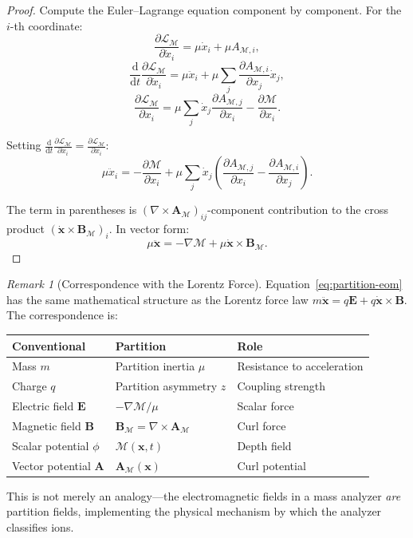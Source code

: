 \documentclass[11pt,twocolumn,a4paper]{article}
\theoremstyle{definition}
\theoremstyle{remark}
\newtheorem{remark}[theorem]{Remark}
\newcommand{\Depth}{\mathcal{M}}
\newcommand{\partinert}{\mu}
\newcommand{\Apartition}{\mathbf{A}_{\mathcal{M}}}
\newcommand{\Lagr}{\mathcal{L}}
\begin{document}
\begin{proof}
Compute the Euler--Lagrange equation component by component. For the $i$-th coordinate:
\[
  \frac{\partial \Lagr_\Depth}{\partial \dot{x}_i} = \partinert \dot{x}_i + \partinert A_{\Depth,i},
\]
\[
  \frac{\mathrm{d}}{\mathrm{d}t}\frac{\partial \Lagr_\Depth}{\partial \dot{x}_i} = \partinert \ddot{x}_i + \partinert \sum_j \frac{\partial A_{\Depth,i}}{\partial x_j} \dot{x}_j,
\]
\[
  \frac{\partial \Lagr_\Depth}{\partial x_i} = \partinert \sum_j \dot{x}_j \frac{\partial A_{\Depth,j}}{\partial x_i} - \frac{\partial \Depth}{\partial x_i}.
\]

Setting $\frac{\mathrm{d}}{\mathrm{d}t}\frac{\partial \Lagr_\Depth}{\partial \dot{x}_i} = \frac{\partial \Lagr_\Depth}{\partial x_i}$:
\[
  \partinert \ddot{x}_i = -\frac{\partial \Depth}{\partial x_i} + \partinert \sum_j \dot{x}_j \left(\frac{\partial A_{\Depth,j}}{\partial x_i} - \frac{\partial A_{\Depth,i}}{\partial x_j}\right).
\]

The term in parentheses is $(\nabla \times \Apartition)_{ij}$-component contribution to the cross product $(\dot{\mathbf{x}} \times \mathbf{B}_\Depth)_i$. In vector form:
\[
  \partinert \ddot{\mathbf{x}} = -\nabla\Depth + \partinert \dot{\mathbf{x}} \times \mathbf{B}_\Depth.
\]
\end{proof}

\begin{remark}[Correspondence with the Lorentz Force]
\label{rem:lorentz}
Equation~\eqref{eq:partition-eom} has the same mathematical structure as the Lorentz force law $m\ddot{\mathbf{x}} = q\mathbf{E} + q\dot{\mathbf{x}} \times \mathbf{B}$. The correspondence is:
\begin{center}
\begin{tabular}{lll}
\toprule
\textbf{Conventional} & \textbf{Partition} & \textbf{Role} \\
\midrule
Mass $m$ & Partition inertia $\partinert$ & Resistance to acceleration \\
Charge $q$ & Partition asymmetry $z$ & Coupling strength \\
Electric field $\mathbf{E}$ & $-\nabla\Depth/\partinert$ & Scalar force \\
Magnetic field $\mathbf{B}$ & $\mathbf{B}_\Depth = \nabla \times \Apartition$ & Curl force \\
Scalar potential $\phi$ & $\Depth(\mathbf{x},t)$ & Depth field \\
Vector potential $\mathbf{A}$ & $\Apartition(\mathbf{x})$ & Curl potential \\
\bottomrule
\end{tabular}
\end{center}
This is not merely an analogy---the electromagnetic fields in a mass analyzer \emph{are} partition fields, implementing the physical mechanism by which the analyzer classifies ions.
\end{remark}
\end{document}

